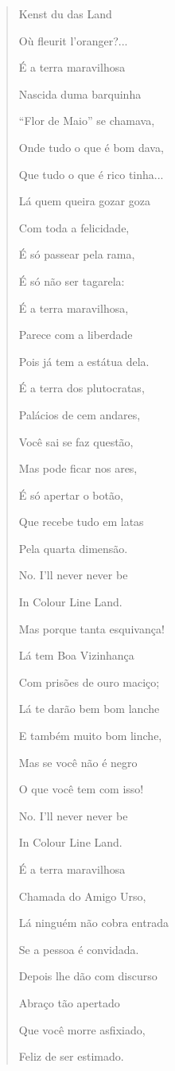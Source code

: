 \begin{verse}
Kenst du das Land

Où fleurit l'oranger?...

É a terra maravilhosa

Nascida duma barquinha

``Flor de Maio'' se chamava,

Onde tudo o que é bom dava,

Que tudo o que é rico tinha...

Lá quem queira gozar goza

Com toda a felicidade,

É só passear pela rama,

É só não ser tagarela:

É a terra maravilhosa,

Parece com a liberdade

Pois já tem a estátua dela.

É a terra dos plutocratas,

Palácios de cem andares,

Você sai se faz questão,

Mas pode ficar nos ares,

É só apertar o botão,

Que recebe tudo em latas

Pela quarta dimensão.

No. I'll never never be

In Colour Line Land.

Mas porque tanta esquivança!

Lá tem Boa Vizinhança

Com prisões de ouro maciço;

Lá te darão bem bom lanche

E também muito bom linche,

Mas se você não é negro

O que você tem com isso!

No. I'll never never be

In Colour Line Land.

É a terra maravilhosa

Chamada do Amigo Urso,

Lá ninguém não cobra entrada

Se a pessoa é convidada.

Depois lhe dão com discurso

Abraço tão apertado

Que você morre asfixiado,

Feliz de ser estimado.


\end{verse}
